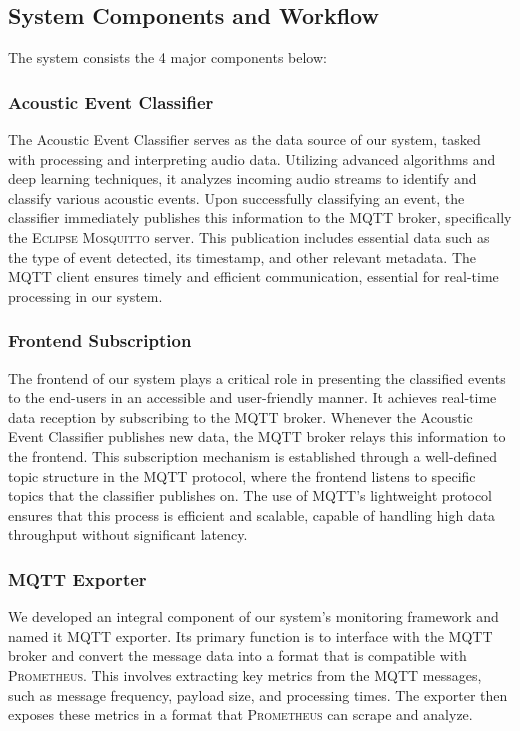 \subsection{System Components and Workflow}
The system consists the 4 major components below:
\subsubsection{Acoustic Event Classifier}
The Acoustic Event Classifier serves as the data source of our system, tasked with processing and interpreting audio data\cite{sampath2019cnn}. Utilizing advanced algorithms and deep learning techniques, it analyzes incoming audio streams to identify and classify various acoustic events. Upon successfully classifying an event, the classifier immediately publishes this information to the MQTT broker, specifically the \textsc{Eclipse Mosquitto} server. This publication includes essential data such as the type of event detected, its timestamp, and other relevant metadata. The MQTT client ensures timely and efficient communication, essential for real-time processing in our system.

\subsubsection{Frontend Subscription}
The frontend of our system plays a critical role in presenting the classified events to the end-users in an accessible and user-friendly manner. It achieves real-time data reception by subscribing to the MQTT broker. Whenever the Acoustic Event Classifier publishes new data, the MQTT broker relays this information to the frontend. This subscription mechanism is established through a well-defined topic structure in the MQTT protocol, where the frontend listens to specific topics that the classifier publishes on. The use of MQTT’s lightweight protocol ensures that this process is efficient and scalable, capable of handling high data throughput without significant latency.

\subsubsection{MQTT Exporter}
We developed an integral component of our system's monitoring framework and named it MQTT exporter. Its primary function is to interface with the MQTT broker and convert the message data into a format that is compatible with \textsc{Prometheus}. This involves extracting key metrics from the MQTT messages, such as message frequency, payload size, and processing times. The exporter then exposes these metrics in a format that \textsc{Prometheus} can scrape and analyze.


